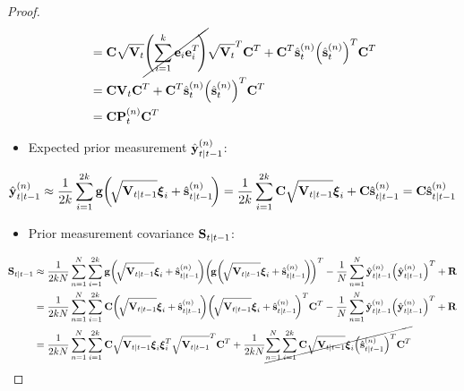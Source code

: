 \begin{proof}
\begin{align*}
					&= \boldsymbol{\mathrm{C}} \sqrt{\boldsymbol{\mathrm{V}}_t} \cancel{\Bigg(\! \sum_{i = 1}^{k} \boldsymbol{\mathrm{e}}_i \boldsymbol{\mathrm{e}}_i^T \!\Bigg)} \sqrt{\boldsymbol{\mathrm{V}}_t}^T \boldsymbol{\mathrm{C}}^T + \boldsymbol{\mathrm{C}}^T \hat{\boldsymbol{\mathrm{s}}}_t^{(n)} \Big(\hat{\boldsymbol{\mathrm{s}}}_t^{(n)}\Big)^T \boldsymbol{\mathrm{C}}^T \\
					&= \boldsymbol{\mathrm{C}} \boldsymbol{\mathrm{V}}_t \boldsymbol{\mathrm{C}}^T + \boldsymbol{\mathrm{C}}^T \hat{\boldsymbol{\mathrm{s}}}_t^{(n)} \Big(\hat{\boldsymbol{\mathrm{s}}}_t^{(n)}\Big)^T \boldsymbol{\mathrm{C}}^T \\
					&= \boldsymbol{\mathrm{C}} \boldsymbol{\mathrm{P}}_t^{(n)} \boldsymbol{\mathrm{C}}^T
			\end{align*}
			\begin{itemize}
				\item Expected prior measurement \( \hat{\boldsymbol{\mathrm{y}}}_{t \vert t - 1}^{(n)} \):
			\end{itemize}
			\begin{align*}
				\hat{\boldsymbol{\mathrm{y}}}_{t \vert t - 1}^{(n)}
					\approx \frac{1}{2k} \sum_{i = 1}^{2k} \boldsymbol{\mathrm{g}}\bigg(\! \sqrt{\boldsymbol{\mathrm{V}}_{t \vert t - 1}} \boldsymbol{\mathrm{\xi}}_i + \hat{\boldsymbol{\mathrm{s}}}_{t \vert t - 1}^{(n)} \!\bigg)
					= \frac{1}{2k} \sum_{i = 1}^{2k} \boldsymbol{\mathrm{C}} \sqrt{\boldsymbol{\mathrm{V}}_{t \vert t - 1}} \boldsymbol{\mathrm{\xi}}_i + \boldsymbol{\mathrm{C}} \hat{\boldsymbol{\mathrm{s}}}_{t \vert t - 1}^{(n)}
					= \boldsymbol{\mathrm{C}} \hat{\boldsymbol{\mathrm{s}}}_{t \vert t - 1}^{(n)}
			\end{align*}
			\begin{itemize}
				\item Prior measurement covariance \( \boldsymbol{\mathrm{S}}_{t \vert t - 1} \):
			\end{itemize}
			\begin{align*}
				\mat{S}_{t \subgiven t - 1}
					&\approx \frac{1}{2kN} \sum_{n = 1}^{N} \sum_{i = 1}^{2k} \vec{g}\bigg(\!\sqrt{\mat{V}_{t \subgiven t - 1}} \vec{\xi}_i + \hat{\vec{s}}_{t \subgiven t - 1}^{(n)}\!\bigg) \bigg(\!\vec{g}\bigg(\!\sqrt{\mat{V}_{t \subgiven t - 1}} \vec{\xi}_i + \hat{\vec{s}}_{t \subgiven t - 1}^{(n)}\!\bigg)\!\bigg)^T - \frac{1}{N} \sum_{n = 1}^{N} \hat{\vec{y}}_{t \subgiven t - 1}^{(n)} \Big( \hat{\vec{y}}_{t \subgiven t - 1}^{(n)} \Big)^T + \mat{R} \\
					&= \frac{1}{2kN} \sum_{n = 1}^{N} \sum_{i = 1}^{2k} \mat{C} \bigg(\!\sqrt{\mat{V}_{t \subgiven t - 1}} \vec{\xi}_i + \hat{\vec{s}}_{t \subgiven t - 1}^{(n)}\!\bigg) \bigg(\!\sqrt{\mat{V}_{t \subgiven t - 1}} \vec{\xi}_i + \hat{\vec{s}}_{t \subgiven t - 1}^{(n)}\!\bigg)^T \mat{C}^T - \frac{1}{N} \sum_{n = 1}^{N} \hat{\vec{y}}_{t \subgiven t - 1}^{(n)} \Big( \hat{\vec{y}}_{t \subgiven t - 1}^{(n)} \Big)^T + \mat{R} \\
					&= \frac{1}{2kN} \sum_{n = 1}^{N} \sum_{i = 1}^{2k} \mat{C} \sqrt{\mat{V}_{t \subgiven t - 1}} \vec{\xi}_i \vec{\xi}_i^T \sqrt{\mat{V}_{t \subgiven t - 1}}^T \mat{C}^T + \frac{1}{2kN} \cancel{\sum_{n = 1}^{N} \sum_{i = 1}^{2k} \mat{C} \sqrt{\mat{V}_{t \subgiven t - 1}} \vec{\xi}_i \Big(\hat{\vec{s}}_{t \subgiven t - 1}^{(n)}\Big)^T \mat{C}^T} \\

\end{align*}
\end{proof}
